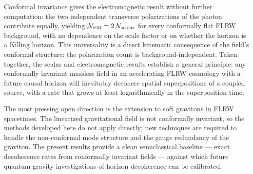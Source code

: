 Conformal invariance gives the electromagnetic result without further
computation: the two independent transverse polarizations of the photon
contribute equally, yielding $\mathcal{N}_{\rm EM} = 2\,\mathcal{N}_{\rm scalar}$
for every conformally flat FLRW background, with no dependence on the
scale factor or on whether the horizon is a Killing horizon.  This
universality is a direct kinematic consequence of the field's conformal
structure: the polarization count is background-independent.  Taken
together, the scalar and electromagnetic results establish a general
principle: any conformally invariant massless field in an accelerating
FLRW cosmology with a future causal horizon will inevitably decohere
spatial superpositions of a coupled source, with a rate that grows at
least logarithmically in the superposition time.

The most pressing open direction is the extension to soft gravitons in
FLRW spacetimes.  The linearized gravitational field is not conformally
invariant, so the methods developed here do not apply directly; new
techniques are required to handle the non-conformal mode structure and
the gauge redundancy of the graviton.  The present results provide a
clean semiclassical baseline — exact decoherence rates from conformally
invariant fields — against which future quantum-gravity investigations of
horizon decoherence can be calibrated.

